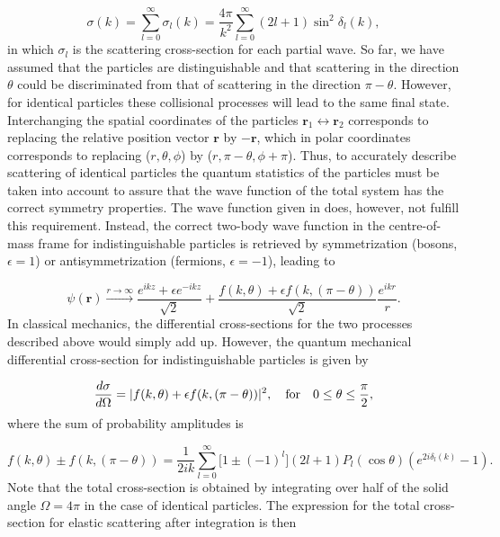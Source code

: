 \begin{equation}
\sigma(k)= \sum_{l=0}^{\infty} \sigma_l(k) = \frac{4\pi}{k^2}\sum_{l=0}^{\infty}(2l+1)\sin^2\delta_l(k),
\end{equation}
in which $\sigma_l$ is the scattering cross-section for each partial wave. So far, we have assumed that the particles are distinguishable and that scattering in the direction $\theta$ could be discriminated from that of scattering in the direction $\pi-\theta$. However, for identical particles these collisional processes will lead to the same final state. Interchanging the spatial coordinates of the particles $\mathbf{r}_1 \leftrightarrow \mathbf{r}_2$ corresponds to replacing the relative position vector $\mathbf{r}$ by $-\mathbf{r}$, which in polar coordinates corresponds to replacing ($r,\theta,\phi$) by ($r,\pi-\theta,\phi+\pi$). Thus, to accurately describe scattering of identical particles the quantum statistics of the particles must be taken into account to assure that the wave function of the total system has the correct symmetry properties. The wave function given in  does, however, not fulfill this requirement. Instead, the correct two-body wave function in the centre-of-mass frame for indistinguishable particles is retrieved by symmetrization (bosons, $\epsilon = 1$) or antisymmetrization (fermions, $\epsilon = -1$), leading to

\begin{equation}
\psi(\mathbf{r}) \xrightarrow{r \to \infty} \frac{e^{ikz} + \epsilon e^{-ikz}}{\sqrt{2}} + \frac{f(k,\theta)+\epsilon f(k,(\pi-\theta))}{\sqrt{2}}\frac{e^{ikr}}{r}.
\end{equation}
In classical mechanics, the differential cross-sections for the two processes described above would simply add up. However, the quantum mechanical differential cross-section for indistinguishable particles is given by

\begin{equation}
\frac{d\sigma}{d\Omega} = \lvert f(k,\theta)+\epsilon f(k,(\pi-\theta))\rvert^2, \quad \text{for} \quad 0 \leq \theta \leq \frac{\pi}{2},
\end{equation}
where the sum of probability amplitudes is

\begin{equation}
f(k,\theta) \pm f(k,(\pi-\theta)) = \frac{1}{2ik}\sum_{l=0}^{\infty} \big[1 \pm (-1)^l\big](2l+1)P_l(\cos\theta)(e^{2i\delta_l(k)} - 1).
\end{equation}
Note that the total cross-section is obtained by integrating over half of the solid angle $\Omega =4\pi$ in the case of identical particles. The expression for the total cross-section for elastic scattering after integration is then

